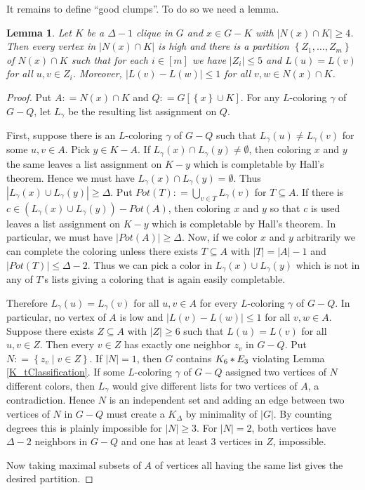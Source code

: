 \documentclass[12pt]{article}
\theoremstyle{plain}
\newtheorem{lem}[thm]{Lemma}
\theoremstyle{definition}
\theoremstyle{remark}
\newcommand{\set}[1]{\left\{ #1 \right\}}
\newcommand{\setbs}[2]{\left\{ #1 \mid #2 \right\}}
\newcommand{\card}[1]{\left|#1\right|}
\newcommand{\irange}[1]{\left[#1\right]}
\newcommand{\join}[2]{#1 \mbox{\hspace{2 pt}$\ast$\hspace{2 pt}} #2}
\newcommand{\DefinedAs}{\mathrel{\mathop:}=}
\begin{document}
It remains to define ``good clumps''.  To do so we need a lemma.

\begin{lem}\label{clumping}
Let $K$ be a $\Delta-1$ clique in $G$ and $x \in G - K$ with $\card{N(x) \cap
K} \geq 4$.  Then every vertex in $\card{N(x) \cap
K}$ is high and there is a partition $\set{Z_1, \ldots, Z_m}$
of $N(x) \cap K$ such that for each $i \in \irange{m}$ we have $\card{Z_i} \leq
5$ and $L(u) = L(v)$ for all $u, v \in Z_i$.  Moreover, $\card{L(v) - L(w)}
\leq 1$ for all $v, w \in N(x) \cap K$.
\end{lem}
\begin{proof}
Put $A \DefinedAs N(x) \cap K$ and $Q \DefinedAs G[\set{x} \cup K]$.  For any
$L$-coloring $\gamma$ of $G - Q$, let $L_\gamma$ be the resulting list
assignment on $Q$.

First, suppose there is an $L$-coloring $\gamma$ of $G - Q$ such that
$L_\gamma(u) \neq L_\gamma(v)$ for some $u, v \in A$.  Pick $y \in K - A$.  If
$L_\gamma(x) \cap L_\gamma(y) \neq \emptyset$, then coloring $x$ and $y$ the
same leaves a list assignment on $K - y$  which is completable by Hall's theorem.
Hence we must have $L_\gamma(x) \cap L_\gamma(y) = \emptyset$.  Thus $\card{L_\gamma(x) \cup L_\gamma(y)} \geq \Delta$.  Put $Pot(T) \DefinedAs \bigcup_{v \in T} L_\gamma(v)$ for $T \subseteq A$.  If there is $c \in (L_\gamma(x) \cup L_\gamma(y)) - Pot(A)$, then coloring $x$ and $y$ so that $c$ is used leaves a list assignment on $K-y$ which is completable by Hall's theorem.  In particular, we must have $\card{Pot(A)} \geq \Delta$. Now, if we color $x$ and $y$ arbitrarily we can complete the coloring unless there exists $T \subseteq A$ with $\card{T} = \card{A}-1$ and $\card{Pot(T)} \leq \Delta - 2$.  Thus we can pick a color in $L_\gamma(x) \cup L_\gamma(y)$ which is not in any of $T$'s lists giving a coloring that is again easily completable.

Therefore $L_\gamma(u) = L_\gamma(v)$ for all $u, v \in A$ for every
$L$-coloring $\gamma$ of $G - Q$.  In particular, no vertex of $A$ is
low and $\card{L(v) - L(w)} \leq 1$ for all $v, w \in A$.  Suppose there exists
$Z \subseteq A$ with $\card{Z} \geq 6$ such that $L(u) = L(v)$ for all $u, v \in Z$.  Then every $v
\in Z$ has exactly one neighbor $z_v$ in $G-Q$.  Put $N \DefinedAs
\setbs{z_v}{v \in Z}$.  If $\card{N} = 1$, then $G$ contains $\join{K_6}{E_3}$
violating Lemma \ref{K_tClassification}.  If some $L$-coloring $\gamma$ of $G-Q$ assigned
two vertices of $N$ different colors, then $L_\gamma$ would give different lists
for two vertices of $A$, a contradiction.  Hence $N$ is an independent set and
adding an edge between two vertices of $N$ in $G-Q$ must create a $K_\Delta$ by
minimality of $\card{G}$.  By counting degrees this is plainly impossible for
$\card{N} \geq 3$.  For $\card{N} = 2$, both vertices have $\Delta-2$ neighbors
in $G-Q$ and one has at least $3$ vertices in $Z$, impossible.

Now taking maximal subsets of $A$ of vertices all having the same list gives the
desired partition.
\end{proof}
\end{document}
